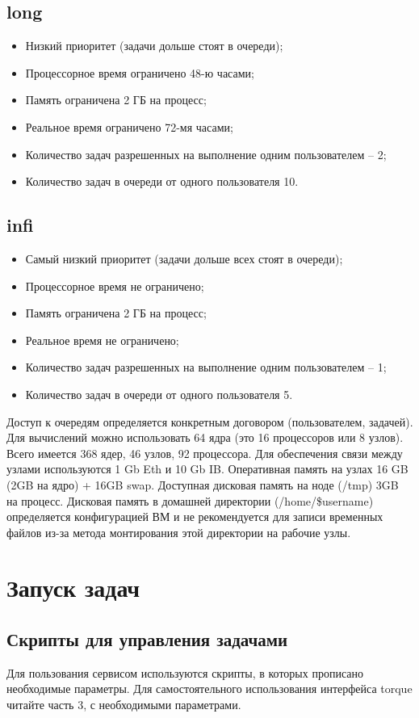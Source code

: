 \documentclass[a4paper,8pt]{extreport}
\begin{document}
\subsection{long}
\begin{itemize}
 \item Низкий приоритет (задачи дольше стоят в очереди);
 \item Процессорное время ограничено 48-ю часами;
 \item Память ограничена 2 ГБ на процесс;
 \item Реальное время ограничено 72-мя часами;
 \item Количество задач разрешенных на выполнение одним пользователем -- 2;
 \item Количество задач в очереди от одного пользователя 10.
\end{itemize}

\subsection{infi}
\begin{itemize}
 \item Самый низкий приоритет (задачи дольше всех  стоят в очереди);
 \item Процессорное время не ограничено;
 \item Память ограничена 2 ГБ на процесс;
 \item Реальное время не ограничено;
 \item Количество задач разрешенных на выполнение одним пользователем -- 1;
 \item Количество задач в очереди от одного пользователя 5.
\end{itemize}
Доступ к очередям определяется конкретным договором (пользователем, задачей).
Для вычислений можно использовать 64 ядра (это 16 процессоров или 8 узлов).
Всего имеется 368 ядер, 46 узлов, 92 процессора.
Для обеспечения связи между узлами используются 1 Gb Eth и 10 Gb IB.
Оперативная память на узлах 16 GB (2GB на ядро) + 16GB swap.
Доступная дисковая память на ноде (/tmp) 3GB на процесс.
Дисковая память в домашней директории (/home/\$username) определяется конфигурацией ВМ и не рекомендуется для 
записи временных файлов из-за метода монтирования этой директории на рабочие узлы.

\section{Запуск задач}
\subsection{Скрипты для управления задачами}
Для пользования сервисом используются скрипты, в которых прописано необходимые параметры.
Для самостоятельного использования интерфейса torque читайте часть 3, с необходимыми параметрами. 
\end{document}
